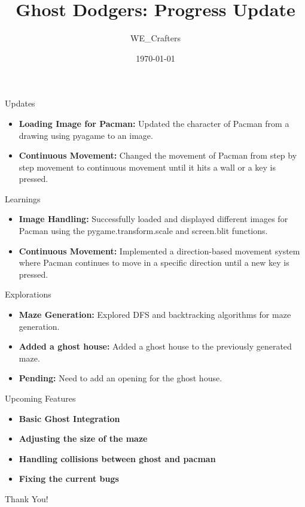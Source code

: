 \documentclass{beamer}
\title{Ghost Dodgers: Progress Update}
\author{WE\_Crafters}
\date{\today}
\begin{document}
\begin{frame}
  \titlepage
\end{frame}

\begin{frame}{Updates}
	\begin{itemize}
		\item \textbf{Loading Image for Pacman:} Updated the character of Pacman from a drawing using pyagame to an image.
		\item \textbf{Continuous Movement:} Changed the movement of Pacman from step by step movement to continuous movement until it hits a wall or a key is pressed.
	\end{itemize}
\end{frame}

\begin{frame}{Learnings}
	\begin{itemize}
		\item \textbf{Image Handling:} Successfully loaded and displayed different images for Pacman using the pygame.transform.scale and screen.blit functions.
		\item \textbf{Continuous Movement:} Implemented a direction-based movement system where Pacman continues to move in a specific direction until a new key is pressed.
	\end{itemize}
\end{frame}

\begin{frame}{Explorations}
	\begin{itemize}
		\item \textbf{Maze Generation:} Explored DFS and backtracking algorithms for maze generation.
		\item \textbf{Added a ghost house:} Added a ghost house to the previously generated maze.
		\item \textbf{Pending:} Need to add an opening for the ghost house.
	\end{itemize}
\end{frame}

\begin{frame}{Upcoming Features}
	\begin{itemize}
		\item \textbf{Basic Ghost Integration}
		\item \textbf{Adjusting the size of the maze}
		\item \textbf{Handling collisions between ghost and pacman}
		\item \textbf{Fixing the current bugs}
	\end{itemize}
\end{frame}

\begin{frame}
    \centering
    \vfill
    \Huge Thank You!
    \vfill
\end{frame}
\end{document}
